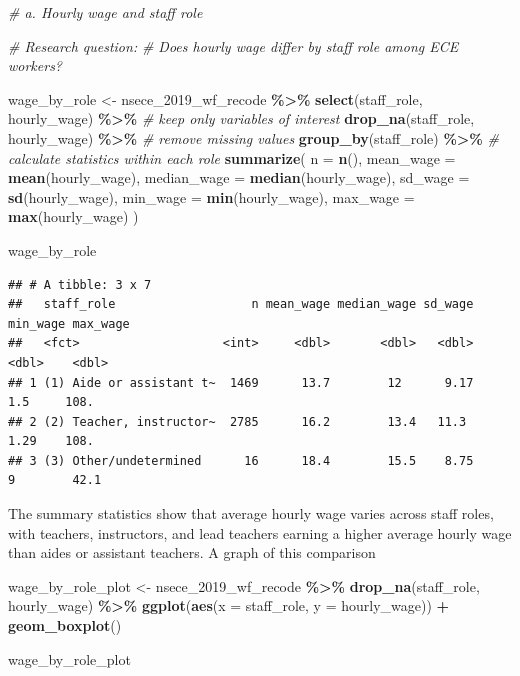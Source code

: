 \documentclass[
]{article}
\newenvironment{Shaded}{\begin{snugshade}}{\end{snugshade}}
\newcommand{\AttributeTok}[1]{\textcolor[rgb]{0.13,0.29,0.53}{#1}}
\newcommand{\CommentTok}[1]{\textcolor[rgb]{0.56,0.35,0.01}{\textit{#1}}}
\newcommand{\FunctionTok}[1]{\textcolor[rgb]{0.13,0.29,0.53}{\textbf{#1}}}
\newcommand{\NormalTok}[1]{#1}
\newcommand{\OtherTok}[1]{\textcolor[rgb]{0.56,0.35,0.01}{#1}}
\newcommand{\SpecialCharTok}[1]{\textcolor[rgb]{0.81,0.36,0.00}{\textbf{#1}}}
\begin{document}
\begin{Shaded}
\begin{Highlighting}[]
\CommentTok{\# a. Hourly wage and staff role}

\CommentTok{\# Research question:}
\CommentTok{\# Does hourly wage differ by staff role among ECE workers?}

\NormalTok{wage\_by\_role }\OtherTok{\textless{}{-}}
\NormalTok{  nsece\_2019\_wf\_recode }\SpecialCharTok{\%\textgreater{}\%}
  \FunctionTok{select}\NormalTok{(staff\_role, hourly\_wage) }\SpecialCharTok{\%\textgreater{}\%}          \CommentTok{\# keep only variables of interest}
  \FunctionTok{drop\_na}\NormalTok{(staff\_role, hourly\_wage) }\SpecialCharTok{\%\textgreater{}\%}         \CommentTok{\# remove missing values}
  \FunctionTok{group\_by}\NormalTok{(staff\_role) }\SpecialCharTok{\%\textgreater{}\%}                     \CommentTok{\# calculate statistics within each role}
  \FunctionTok{summarize}\NormalTok{(}
    \AttributeTok{n =} \FunctionTok{n}\NormalTok{(),}
    \AttributeTok{mean\_wage =} \FunctionTok{mean}\NormalTok{(hourly\_wage),}
    \AttributeTok{median\_wage =} \FunctionTok{median}\NormalTok{(hourly\_wage),}
    \AttributeTok{sd\_wage =} \FunctionTok{sd}\NormalTok{(hourly\_wage),}
    \AttributeTok{min\_wage =} \FunctionTok{min}\NormalTok{(hourly\_wage),}
    \AttributeTok{max\_wage =} \FunctionTok{max}\NormalTok{(hourly\_wage)}
\NormalTok{  )}

\NormalTok{wage\_by\_role}
\end{Highlighting}
\end{Shaded}

\begin{verbatim}
## # A tibble: 3 x 7
##   staff_role                   n mean_wage median_wage sd_wage min_wage max_wage
##   <fct>                    <int>     <dbl>       <dbl>   <dbl>    <dbl>    <dbl>
## 1 (1) Aide or assistant t~  1469      13.7        12      9.17     1.5     108. 
## 2 (2) Teacher, instructor~  2785      16.2        13.4   11.3      1.29    108. 
## 3 (3) Other/undetermined      16      18.4        15.5    8.75     9        42.1
\end{verbatim}

The summary statistics show that average hourly wage varies across staff
roles, with teachers, instructors, and lead teachers earning a higher
average hourly wage than aides or assistant teachers. A graph of this
comparison

\begin{Shaded}
\begin{Highlighting}[]
\NormalTok{wage\_by\_role\_plot }\OtherTok{\textless{}{-}}
\NormalTok{  nsece\_2019\_wf\_recode }\SpecialCharTok{\%\textgreater{}\%}
  \FunctionTok{drop\_na}\NormalTok{(staff\_role, hourly\_wage) }\SpecialCharTok{\%\textgreater{}\%}
  \FunctionTok{ggplot}\NormalTok{(}\FunctionTok{aes}\NormalTok{(}\AttributeTok{x =}\NormalTok{ staff\_role, }\AttributeTok{y =}\NormalTok{ hourly\_wage)) }\SpecialCharTok{+}
  \FunctionTok{geom\_boxplot}\NormalTok{()}

\NormalTok{wage\_by\_role\_plot}
\end{Highlighting}
\end{Shaded}
\end{document}

